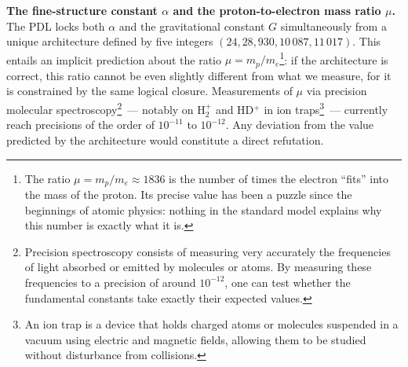 \documentclass[12pt, a4paper, openright]{book}
\begin{document}
\textbf{The fine-structure constant $\alpha$ and the proton-to-electron mass ratio $\mu$.} The PDL locks both $\alpha$ and the gravitational constant $G$ simultaneously from a unique architecture defined by five integers $(24, 28, 930, 10\,087, 11\,017)$. This entails an implicit prediction about the ratio $\mu = m_p / m_e$\footnote{The ratio $\mu = m_p/m_e \approx 1836$ is the number of times the electron ``fits'' into the mass of the proton. Its precise value has been a puzzle since the beginnings of atomic physics: nothing in the standard model explains why this number is exactly what it is.}: if the architecture is correct, this ratio cannot be even slightly different from what we measure, for it is constrained by the same logical closure. Measurements of $\mu$ via precision molecular spectroscopy\footnote{Precision spectroscopy consists of measuring very accurately the frequencies of light absorbed or emitted by molecules or atoms. By measuring these frequencies to a precision of around $10^{-12}$, one can test whether the fundamental constants take exactly their expected values.}~--- notably on H$_2^+$ and HD$^+$ in ion traps\footnote{An ion trap is a device that holds charged atoms or molecules suspended in a vacuum using electric and magnetic fields, allowing them to be studied without disturbance from collisions.}~--- currently reach precisions of the order of $10^{-11}$ to $10^{-12}$. Any deviation from the value predicted by the architecture would constitute a direct refutation.

\medskip
\end{document}

